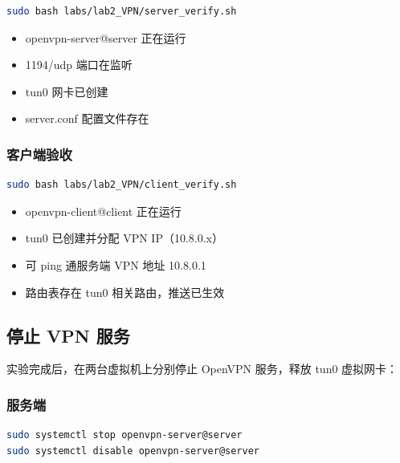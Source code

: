 \documentclass[12pt,a4paper]{ctexart}
\begin{document}
\begin{cmdbox}
\begin{lstlisting}[language=bash]
sudo bash labs/lab2_VPN/server_verify.sh
\end{lstlisting}
\end{cmdbox}

\begin{itemize}
  \item openvpn-server@server 正在运行
  \item 1194/udp 端口在监听
  \item tun0 网卡已创建
  \item server.conf 配置文件存在
\end{itemize}

\subsubsection{客户端验收}

\begin{cmdbox}
\begin{lstlisting}[language=bash]
sudo bash labs/lab2_VPN/client_verify.sh
\end{lstlisting}
\end{cmdbox}

\begin{itemize}
  \item openvpn-client@client 正在运行
  \item tun0 已创建并分配 VPN IP（10.8.0.x）
  \item 可 ping 通服务端 VPN 地址 10.8.0.1
  \item 路由表存在 tun0 相关路由，推送已生效
\end{itemize}

\subsection{停止 VPN 服务}

实验完成后，在两台虚拟机上分别停止 OpenVPN 服务，释放 tun0 虚拟网卡：

\subsubsection{服务端}

\begin{cmdbox}
\begin{lstlisting}[language=bash]
sudo systemctl stop openvpn-server@server
sudo systemctl disable openvpn-server@server
\end{lstlisting}
\end{cmdbox}
\end{document}

